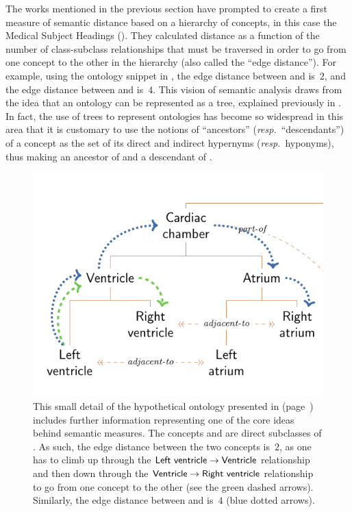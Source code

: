 The works mentioned in the previous section have prompted \citet{Rada1989} to create a first measure of semantic distance based on a hierarchy of concepts, in this case the Medical Subject Headings (). They calculated distance as a function of the number of class-subclass relationships that must be traversed in order to go from one concept to the other in the hierarchy (also called the ``edge distance''). For example, using the ontology snippet in , the edge distance between  and  is~$2$, and the edge distance between  and  is~$4$. This vision of semantic analysis draws from the idea that an ontology can be represented as a tree, explained previously in . In fact, the use of trees to represent ontologies has become so widespread in this area that it is customary to use the notions of ``ancestors'' (\emph{resp.}~``descendants'') of a concept as the set of its direct and indirect hypernyms (\emph{resp.}~hyponyms), thus making  an ancestor of  and a descendant of .

\begin{figure}
    \centering
    \includegraphics{images/anatomy-detail.pdf}
    \caption[Semantic measures explained in a hypothetical hierarchy]{This small detail of the hypothetical ontology presented in  (page~\pageref{fig:anatomy-ontology}) includes further information representing one of the core ideas behind semantic measures. The concepts  and  are direct subclasses of . As such, the edge distance between the two concepts is~$2$, as one has to climb up through the $\protect\textsf{Left ventricle} \rightarrow \protect\textsf{Ventricle}$ relationship and then down through the $\protect\textsf{Ventricle} \rightarrow \protect\textsf{Right ventricle}$ relationship to go from one concept to the other (see the green dashed arrows). Similarly, the edge distance between  and  is~$4$ (blue dotted arrows).}
    \label{fig:anatomy-detail}
\end{figure}

